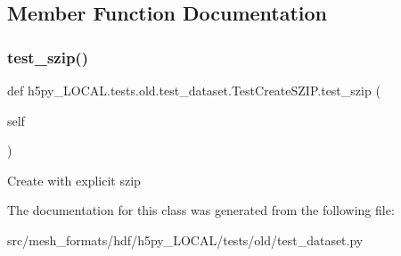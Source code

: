 \subsection{Member Function Documentation}
\mbox{\label{classh5py__LOCAL_1_1tests_1_1old_1_1test__dataset_1_1TestCreateSZIP_a3d7d0d58e015196e82f8b82e1aa91528}} 
\subsubsection{\texorpdfstring{test\+\_\+szip()}{test\_szip()}}
{\footnotesize\ttfamily def h5py\+\_\+\+L\+O\+C\+A\+L.\+tests.\+old.\+test\+\_\+dataset.\+Test\+Create\+S\+Z\+I\+P.\+test\+\_\+szip (\begin{DoxyParamCaption}\item[{}]{self }\end{DoxyParamCaption})}

\begin{DoxyVerb}Create with explicit szip \end{DoxyVerb}
 

The documentation for this class was generated from the following file\+:\begin{DoxyCompactItemize}
\item 
src/mesh\+\_\+formats/hdf/h5py\+\_\+\+L\+O\+C\+A\+L/tests/old/test\+\_\+dataset.\+py\end{DoxyCompactItemize}
